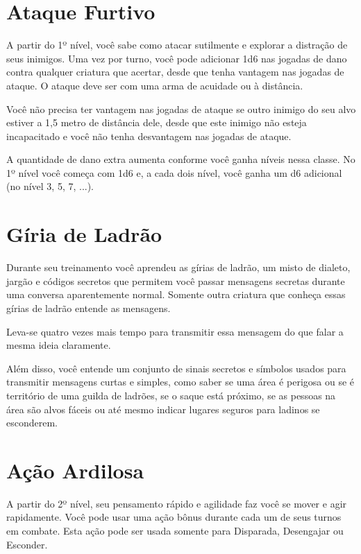 \documentclass{RPG_Adventure}[2021/10/20]
\begin{document}
\begin{multicols}{2}
\section*{Ataque Furtivo}%

A partir do 1º nível, você sabe como atacar sutilmente e explorar a distração de
seus inimigos. Uma vez por turno, você pode adicionar 1d6 nas jogadas de dano
contra qualquer criatura que acertar, desde que tenha vantagem nas jogadas de
ataque. O ataque deve ser com uma arma de acuidade ou à distância.

Você não precisa ter vantagem nas jogadas de ataque se outro inimigo do seu alvo
estiver a 1,5 metro de distância dele, desde que este inimigo não esteja
incapacitado e você não tenha desvantagem nas jogadas de ataque.

A quantidade de dano extra aumenta conforme você ganha níveis nessa classe. No
1º nível você começa com 1d6 e, a cada dois nível, você ganha um d6 adicional
(no nível 3, 5, 7, ...).

\section*{Gíria de Ladrão}%

Durante seu treinamento você aprendeu as gírias de ladrão, um misto de dialeto,
jargão e códigos secretos que permitem você passar mensagens secretas durante
uma conversa aparentemente normal. Somente outra criatura que conheça essas
gírias de ladrão entende as mensagens.

Leva-se quatro vezes mais tempo para transmitir essa mensagem do que falar a
mesma ideia claramente.

Além disso, você entende um conjunto de sinais secretos e símbolos usados para
transmitir mensagens curtas e simples, como saber se uma área é perigosa ou se é
território de uma guilda de ladrões, se o saque está próximo, se as pessoas na
área são alvos fáceis ou até mesmo indicar lugares seguros para ladinos se
esconderem.

\section*{Ação Ardilosa}%

A partir do 2º nível, seu pensamento rápido e agilidade faz você se mover e agir
rapidamente. Você pode usar uma ação bônus durante cada um de seus turnos em
combate. Esta ação pode ser usada somente para Disparada, Desengajar ou
Esconder.


\end{multicols}
\end{document}
